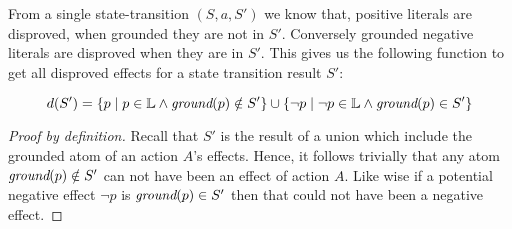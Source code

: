 \documentclass[../Master.tex]{subfiles}
\begin{document}
\begin{theorem}
	 From a single state-transition $(S,a,S')$ we know that,
	positive literals are disproved, when grounded they are not in $S'$. Conversely grounded negative literals are disproved when they are in $S'$. This gives us the following function to get all disproved effects for a state transition result $S'$:
	
	\begin{equation*}
		 d(S') = \left\{
			p \mid p \in \mathbb{L} \land \textit{ground} (p) \notin S'
			\right\} 
			\cup
			 \left\{
			\neg p \mid \neg p \in \mathbb{L} \land \textit{ground}(p) \in S'
			\right\}
	\end{equation*}
	\begin{proof}[Proof by definition]
		Recall that $S'$ is the result of a union which include the grounded atom of an action $A$'s effects. Hence, it follows trivially that any atom $\textit{ground}(p) \notin S'$ can not have been an effect of action $A$.
	Like wise if a potential negative effect $\neg p$ is $\textit{ground}(p) \in S'$ then that could not have been a negative effect.
	\end{proof}
\end{theorem}
\end{document}
